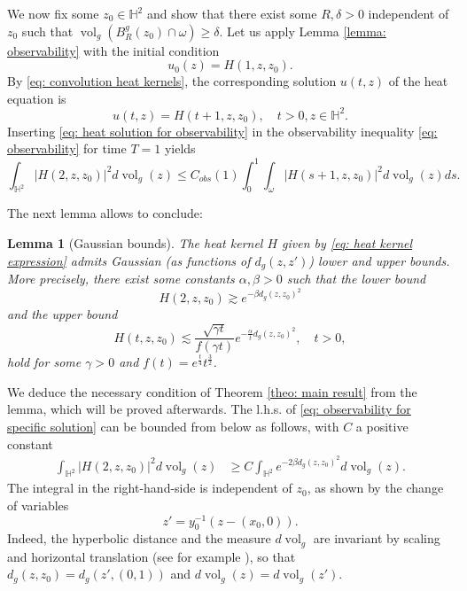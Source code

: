 \documentclass[letterpaper,11pt]{amsart}
\theoremstyle{note}
\newtheorem{lemma}[proposition]{Lemma}
\numberwithin{equation}{section}
\DeclareMathOperator{\vol}{vol}
\begin{document}
We now fix some $z_0 \in \mathbb{H}^2$ and show that there exist some $R, \delta > 0$ independent of $z_0$ such that $\vol_g\left( B^g_R(z_0) \cap \omega \right) \geq \delta$. Let us apply Lemma \ref{lemma: observability} with the initial condition $$u_0(z) = H(1, z, z_0).$$ By \eqref{eq: convolution heat kernels}, the corresponding solution $u(t, z)$ of the heat equation is \begin{equation}
    \label{eq: heat solution for observability}
    u(t,z) = H(t+1, z, z_0), \quad t > 0, z \in \mathbb{H}^2.
\end{equation} Inserting \eqref{eq: heat solution for observability} in the observability inequality \eqref{eq: observability} for time $T = 1$ yields \begin{equation}
    \label{eq: observability for specific solution}
    \int_{\mathbb{H}^2} |H(2, z, z_0)|^2 d\vol_g(z) \leq C_{obs}(1) \int_0^1 \int_\omega |H(s+1, z, z_0)|^2 d\vol_g(z) ds.
\end{equation}

The next lemma allows to conclude: \begin{lemma}[Gaussian bounds]
    \label{lemma: gaussian bounds heat kernel}
    The heat kernel $H$ given by \eqref{eq: heat kernel expression} admits Gaussian (as functions of $d_g(z,z')$) lower and upper bounds. More precisely, there exist some constants $\alpha, \beta > 0$ such that the lower bound \begin{equation}
        \label{eq: gaussian lower bound}
        H(2, z, z_0) \gtrsim e^{-\beta d_g(z,z_0)^2}
    \end{equation} and the upper bound \begin{equation}
        \label{eq: gaussian upper bound} H(t, z, z_0) \lesssim \frac{\sqrt{\gamma t}}{f(\gamma t)} e^{-\frac{\alpha}{t} d_g(z, z_0)^2}, \quad t > 0,
    \end{equation} hold for some $\gamma > 0$ and $f(t) = e^\frac{t}{4} t^\frac{3}{2}$.
\end{lemma} We deduce the necessary condition of Theorem \ref{theo: main result} from the lemma, which will be proved afterwards. The l.h.s. of \eqref{eq: observability for specific solution} can be bounded from below as follows, with $C$ a positive constant $$\begin{aligned}\int_{\mathbb{H}^2} |H(2, z, z_0)|^2 d\vol_g(z) &\geq C \int_{\mathbb{H}^2} e^{-2\beta d_g(z,z_0)^2} d\vol_g(z).\end{aligned}$$ The integral in the right-hand-side is independent of $z_0$, as shown by the change of variables $$z' = y_0^{-1}(z - (x_0,0)).$$ Indeed, the hyperbolic distance and the measure $d\vol_g$ are invariant by scaling and horizontal translation (see for example \cite[(2.6) and (2.8)]{borthwick2016book}), so that $d_g(z, z_0) = d_g(z', (0,1))$ and $d\vol_g(z) = d\vol_g(z')$.
\end{document}
